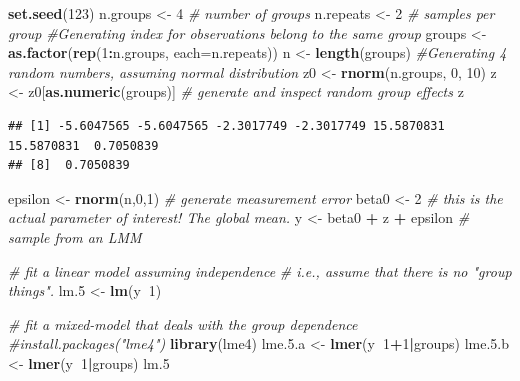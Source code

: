 \documentclass[]{book}
\newenvironment{Shaded}{\begin{snugshade}}{\end{snugshade}}
\newcommand{\KeywordTok}[1]{\textcolor[rgb]{0.13,0.29,0.53}{\textbf{#1}}}
\newcommand{\DataTypeTok}[1]{\textcolor[rgb]{0.13,0.29,0.53}{#1}}
\newcommand{\DecValTok}[1]{\textcolor[rgb]{0.00,0.00,0.81}{#1}}
\newcommand{\FloatTok}[1]{\textcolor[rgb]{0.00,0.00,0.81}{#1}}
\newcommand{\StringTok}[1]{\textcolor[rgb]{0.31,0.60,0.02}{#1}}
\newcommand{\CommentTok}[1]{\textcolor[rgb]{0.56,0.35,0.01}{\textit{#1}}}
\newcommand{\OperatorTok}[1]{\textcolor[rgb]{0.81,0.36,0.00}{\textbf{#1}}}
\newcommand{\NormalTok}[1]{#1}
\begin{document}
\begin{Shaded}
\begin{Highlighting}[]
\KeywordTok{set.seed}\NormalTok{(}\DecValTok{123}\NormalTok{)}
\NormalTok{n.groups <-}\StringTok{ }\DecValTok{4} \CommentTok{# number of groups}
\NormalTok{n.repeats <-}\StringTok{ }\DecValTok{2} \CommentTok{# samples per group}
\CommentTok{#Generating index for observations belong to the same group}
\NormalTok{groups <-}\StringTok{ }\KeywordTok{as.factor}\NormalTok{(}\KeywordTok{rep}\NormalTok{(}\DecValTok{1}\OperatorTok{:}\NormalTok{n.groups, }\DataTypeTok{each=}\NormalTok{n.repeats))}
\NormalTok{n <-}\StringTok{ }\KeywordTok{length}\NormalTok{(groups)}
\CommentTok{#Generating 4 random numbers, assuming normal distribution}
\NormalTok{z0 <-}\StringTok{ }\KeywordTok{rnorm}\NormalTok{(n.groups, }\DecValTok{0}\NormalTok{, }\DecValTok{10}\NormalTok{) }
\NormalTok{z <-}\StringTok{ }\NormalTok{z0[}\KeywordTok{as.numeric}\NormalTok{(groups)] }\CommentTok{# generate and inspect random group effects}
\NormalTok{z}
\end{Highlighting}
\end{Shaded}

\begin{verbatim}
## [1] -5.6047565 -5.6047565 -2.3017749 -2.3017749 15.5870831 15.5870831  0.7050839
## [8]  0.7050839
\end{verbatim}

\begin{Shaded}
\begin{Highlighting}[]
\NormalTok{epsilon <-}\StringTok{ }\KeywordTok{rnorm}\NormalTok{(n,}\DecValTok{0}\NormalTok{,}\DecValTok{1}\NormalTok{) }\CommentTok{# generate measurement error}
\NormalTok{beta0 <-}\StringTok{ }\DecValTok{2} \CommentTok{# this is the actual parameter of interest! The global mean.}
\NormalTok{y <-}\StringTok{ }\NormalTok{beta0 }\OperatorTok{+}\StringTok{ }\NormalTok{z }\OperatorTok{+}\StringTok{ }\NormalTok{epsilon }\CommentTok{# sample from an LMM}

\CommentTok{# fit a linear model assuming independence}
\CommentTok{# i.e., assume that there is no "group things".}
\NormalTok{lm.}\DecValTok{5}\NormalTok{ <-}\StringTok{ }\KeywordTok{lm}\NormalTok{(y}\OperatorTok{~}\DecValTok{1}\NormalTok{)}

\CommentTok{# fit a mixed-model that deals with the group dependence}
\CommentTok{#install.packages("lme4")}
\KeywordTok{library}\NormalTok{(lme4)}
\NormalTok{lme.}\FloatTok{5.}\NormalTok{a <-}\StringTok{ }\KeywordTok{lmer}\NormalTok{(y}\OperatorTok{~}\DecValTok{1}\OperatorTok{+}\DecValTok{1}\OperatorTok{|}\NormalTok{groups) }
\NormalTok{lme.}\FloatTok{5.}\NormalTok{b <-}\StringTok{ }\KeywordTok{lmer}\NormalTok{(y}\OperatorTok{~}\DecValTok{1}\OperatorTok{|}\NormalTok{groups) }
\NormalTok{lm.}\DecValTok{5}
\end{Highlighting}
\end{Shaded}
\end{document}
